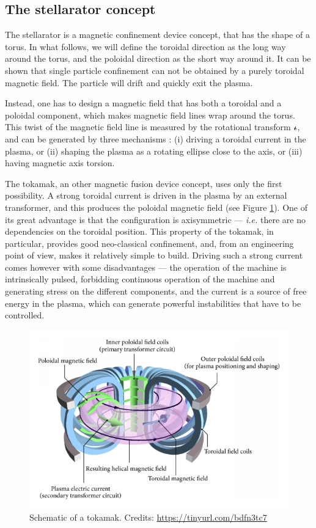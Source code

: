 \documentclass[my_thesis.tex]{subfiles}
\begin{document}
\subsection{The stellarator concept}
The stellarator is a magnetic confinement device concept, that has the shape of a torus. In what follows, we will define the toroidal direction as the long way around the torus, and the poloidal direction as the short way around it. It can be shown that single particle confinement can not be obtained by a purely toroidal magnetic field. The particle will drift and quickly exit the plasma. 

Instead, one has to design a magnetic field that has both a toroidal and a poloidal component, which makes magnetic field lines wrap around the torus. This twist of the magnetic field line is measured by the rotational transform $\text{$\iota\!\!$-}$, and can be generated by three mechanisms \citep{Helander2014}: (i) driving a toroidal current in the plasma, or (ii) shaping the plasma as a rotating ellipse close to the axis, or (iii) having magnetic axis torsion.

The tokamak, an other magnetic fusion device concept, uses only the first possibility. A strong toroidal current is driven in the plasma by an external transformer, and this produces the poloidal magnetic field (see Figure \ref{fig tokamak sketch}). One of its great advantage is that the configuration is axisymmetric --- \textit{i.e.} there are no dependencies on the toroidal position. This property of the tokamak, in particular, provides good neo-classical confinement, and, from an engineering point of view, makes it relatively simple to build. Driving such a strong current comes however with some disadvantages --- the operation of the machine is intrinsically pulsed, forbidding continuous operation of the machine and generating stress on the different components, and the current is a source of free energy in the plasma, which can generate powerful instabilities that have to be controlled.

\begin{figure}
    \centering
    \includegraphics[width=\linewidth]{images/Introduction/TokamakSketch.jpg}
    \caption{Schematic of a tokamak. Credits: \url{https://tinyurl.com/bdfn3tc7}}
    \label{fig tokamak sketch}
\end{figure}
\end{document}
